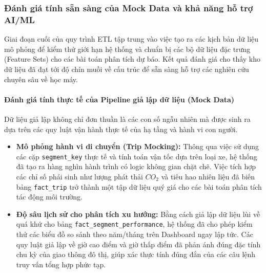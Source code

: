 \subsubsection{ Đánh giá tính sẵn sàng của Mock Data và khả năng hỗ trợ AI/ML}

Giai đoạn cuối của quy trình ETL tập trung vào việc tạo ra các kịch bản dữ liệu mô phỏng để kiểm thử giới hạn hệ thống và chuẩn bị các bộ dữ liệu đặc trưng (Feature Sets) cho các bài toán phân tích dự báo. Kết quả đánh giá cho thấy kho dữ liệu đã đạt tới độ chín muồi về cấu trúc để sẵn sàng hỗ trợ các nghiên cứu chuyên sâu về học máy.

\paragraph{Đánh giá tính thực tế của Pipeline giả lập dữ liệu (Mock Data)}
Dữ liệu giả lập không chỉ đơn thuần là các con số ngẫu nhiên mà được sinh ra dựa trên các quy luật vận hành thực tế của hạ tầng và hành vi con người.
\begin{itemize}
    \item \textbf{Mô phỏng hành vi di chuyển (Trip Mocking):} Thông qua việc sử dụng các cặp \texttt{segment\_key} thực tế và tính toán vận tốc dựa trên loại xe, hệ thống đã tạo ra hàng nghìn hành trình có logic không gian chặt chẽ. Việc tích hợp các chỉ số phái sinh như lượng phát thải $CO_{2}$ và tiêu hao nhiên liệu đã biến bảng \texttt{fact\_trip} trở thành một tập dữ liệu quý giá cho các bài toán phân tích tác động môi trường.
    \item \textbf{Độ sâu lịch sử cho phân tích xu hướng:} Bằng cách giả lập dữ liệu lùi về quá khứ cho bảng \texttt{fact\_segment\_performance}, hệ thống đã cho phép kiểm thử các biểu đồ so sánh theo năm/tháng trên Dashboard ngay lập tức. Các quy luật giả lập về giờ cao điểm và giờ thấp điểm đã phản ánh đúng đặc tính chu kỳ của giao thông đô thị, giúp xác thực tính đúng đắn của các câu lệnh truy vấn tổng hợp phức tạp.
\end{itemize}

